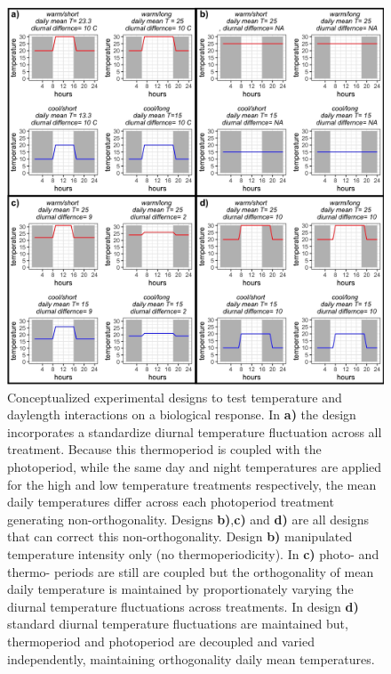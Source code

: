 \documentclass[11pt]{article}
\begin{document}
{\begin{figure}[h!]
    \centering
 \includegraphics[width=\textwidth]{..//Plots/periodicity_figures/designs.jpeg}
    \caption{Conceptualized experimental designs to test temperature and daylength interactions on a biological response. In \textbf{a)} the design incorporates a standardize diurnal temperature fluctuation across all treatment. Because this thermoperiod is coupled with the photoperiod, while the same day and night temperatures are applied for the high and low temperature treatments respectively, the mean daily temperatures differ across each photoperiod treatment generating non-orthogonality. Designs \textbf{b)},\textbf{c)} and \textbf{d)} are all designs that can  correct this non-orthogonality. Design \textbf{b)}  manipulated temperature intensity only (no thermoperiodicity).%
    In  \textbf{c)} photo- and thermo- periods are still are coupled but the orthogonality of mean daily temperature is maintained by proportionately varying the diurnal temperature fluctuations across treatments. %
    In design \textbf{d)} standard diurnal temperature fluctuations are maintained but, thermoperiod and photoperiod are decoupled and varied independently, maintaining orthogonality daily mean temperatures.}%
    \label{fig:ortho}
\end{figure}
 
}
\end{document}

